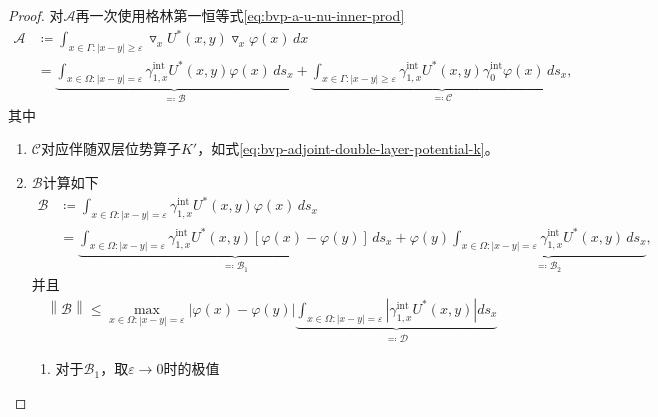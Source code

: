 \begin{proof}
对$\mathcal{A}$再一次使用格林第一恒等式\eqref{eq:bvp-a-u-nu-inner-prod}
\begin{equation*}
\begin{split}
  \mathcal{A} &\coloneqq
  \int_{x \in \Gamma: \left| x - y \right| \ge \varepsilon}
  \triangledown_{x}
  U^{*}(x,y)
  \triangledown_{x}
  \varphi(x)
  \, dx\\
  &=
  \underbrace{
  \int_{x \in \Omega: \left| x - y \right| = \varepsilon}
  \gamma_{1,x}^{\text{int}} U^{*}(x,y) \varphi(x) \, d s_x
  }_{\eqqcolon \mathcal{B}}
  + \underbrace{
  \int_{x \in \Gamma: \left| x - y \right| \ge \varepsilon}
  \gamma_{1,x}^{\text{int}} U^{*}(x,y)
  \gamma_{0}^{\text{int}} \varphi(x)
   \, d s_x,
   }_{\eqqcolon \mathcal{C}}
\end{split}
\end{equation*}
其中
\begin{enumerate}
  \item $\mathcal{C}$对应伴随双层位势算子$K'$，如式\eqref{eq:bvp-adjoint-double-layer-potential-k}。
  \item $\mathcal{B}$计算如下
\begin{equation*}
  \begin{split}
    \mathcal{B} &\coloneqq \int_{x \in \Omega: \left| x - y \right| = \varepsilon}
    \gamma_{1,x}^{\text{int}} U^{*}(x,y) \varphi(x) \, d s_x \\
    &= \underbrace{
    \int_{x \in \Omega: \left| x - y \right| = \varepsilon}
    \gamma_{1,x}^{\text{int}} U^{*}(x,y)
    \left[ \varphi(x) - \varphi(y) \right] \, d s_x
    }_{\eqqcolon \mathcal{B}_1}
    +
    \varphi(y)
    \underbrace{
    \int_{x \in \Omega: \left| x - y \right| = \varepsilon}
    \gamma_{1,x}^{\text{int}} U^{*}(x,y) \, d s_x
    }_{\eqqcolon \mathcal{B}_2},
  \end{split}
\end{equation*}
并且
\begin{equation*}
  \begin{split}
    \left\| \mathcal{B} \right\| \le
    \max_{x \in \Omega: \left| x - y \right| = \varepsilon}
    \left| \varphi(x) - \varphi(y) \right|
    \underbrace{
    \int_{x \in \Omega: \left| x - y \right| = \varepsilon}
    \left|
    \gamma_{1,x}^{\text{int}} U^{*}(x,y)
    \right|
    d s_x
    }_{\eqqcolon \mathcal{D}}
  \end{split}
\end{equation*}
\begin{enumerate}
\item 对于$\mathcal{B}_{1}$，取$\varepsilon \rightarrow 0$时的极值

\end{enumerate}
\end{enumerate}
\end{proof}
